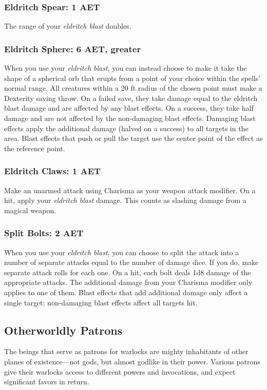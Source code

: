 \subsubsection{Eldritch Spear: 1 AET}
The range of your \textit{eldritch blast} doubles.

\subsubsection{Eldritch Sphere: 6 AET, greater}
When you use your \textit{eldritch blast}, you can instead choose to make it take the shape of a spherical orb that erupts from a point of your choice within the spells' normal range. All creatures within a 20 ft radius of the chosen point must make a Dexterity saving throw. On a failed save, they take damage equal to the eldritch blast damage and are affected by any blast effects. On a success, they take half damage and are not affected by the non-damaging blast effects. Damaging blast effects apply the additional damage (halved on a success) to all targets in the area. Blast effects that push or pull the target use the center point of the effect as the reference point.

\subsubsection{Eldritch Claws: 1 AET}
Make an unarmed attack using Charisma as your weapon attack modifier. On a hit, apply your \textit{eldritch blast} damage. This counts as slashing damage from a magical weapon.

\subsubsection{Split Bolts: 2 AET}
When you use your \textit{eldritch blast}, you can choose to split the attack into a number of separate attacks equal to the number of damage dice. If you do, make separate attack rolls for each one. On a hit, each bolt deals 1d8 damage of the appropriate attacks. The additional damage from your Charisma modifier only applies to one of them. Blast effects that add additional damage only affect a single target; non-damaging blast effects affect all targets hit.

\subsection{Otherworldly Patrons}

The beings that serve as patrons for warlocks are mighty inhabitants of other planes of existence—not gods, but almost godlike in their power. Various patrons give their warlocks access to different powers and invocations, and expect significant favors in return.

